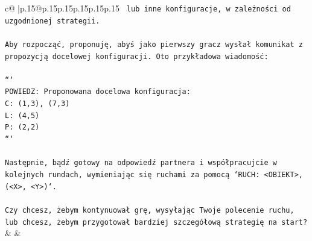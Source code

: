 \documentclass{article}
\begin{document}
{\begin{supertabular}{c@{$\;$}|p{.15\linewidth}@{}p{.15\linewidth}p{.15\linewidth}p{.15\linewidth}p{.15\linewidth}p{.15\linewidth}}
{{{\texttt{ lub inne konfiguracje, w zależności od uzgodnionej strategii.} \\
\\ 
\texttt{Aby rozpocząć, proponuję, abyś jako pierwszy gracz wysłał komunikat z propozycją docelowej konfiguracji. Oto przykładowa wiadomość:} \\
\\ 
\texttt{```} \\
\texttt{POWIEDZ: Proponowana docelowa konfiguracja:} \\
\texttt{C: (1,3), (7,3)} \\
\texttt{L: (4,5)} \\
\texttt{P: (2,2)} \\
\texttt{```} \\
\\ 
\texttt{Następnie, bądź gotowy na odpowiedź partnera i współpracujcie w kolejnych rundach, wymieniając się ruchami za pomocą `RUCH: <OBIEKT>, (<X>, <Y>)`.} \\
\\ 
\texttt{Czy chcesz, żebym kontynuował grę, wysyłając Twoje polecenie ruchu, lub chcesz, żebym przygotował bardziej szczegółową strategię na start?} \\
            }
        }
    }
    & & \\ \\


\end{supertabular}}
\end{document}

